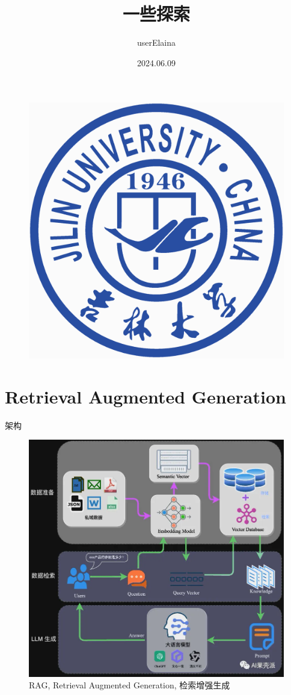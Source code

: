\documentclass{beamer}
\author{userElaina}
\title{一些探索}
\institute{School of AI}
\date{2024.06.09}
\begin{document}
\kaishu
\begin{frame}
    \titlepage
    \begin{figure}[htpb]
        \begin{center}
            \includegraphics[width=0.15\linewidth]{pic/Jilin_University_Logo.eps}
        \end{center}
    \end{figure}
\end{frame}

\begin{frame}
\tableofcontents[sectionstyle=show,subsectionstyle=show/shaded/hide,subsubsectionstyle=show/shaded/hide]
\end{frame}

\section{Retrieval Augmented Generation}

\begin{frame}{架构}
    \begin{figure}[c]
        \centering
        \includegraphics[height=.75\textheight]{pic/1.png}
        \caption{RAG, Retrieval Augmented Generation, 检索增强生成}
    \end{figure}
\end{frame}
\end{document}
